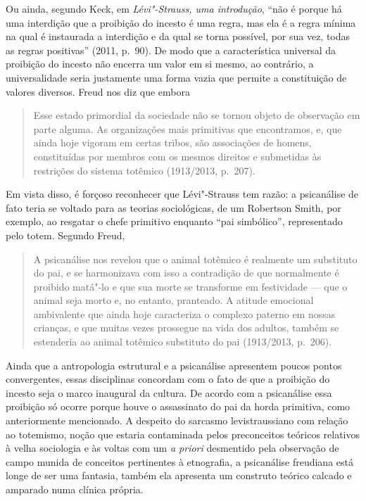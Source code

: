 Ou ainda, segundo Keck, em \emph{Lévi"-Strauss, uma introdução},
``não é porque há uma interdição que a proibição do incesto é uma regra,
mas ela é a regra mínima na qual é instaurada a interdição e da qual se
torna possível, por sua vez, todas as regras positivas'' (2011,
p.~90). De modo que a característica universal da proibição do incesto
não encerra um valor em si mesmo, ao contrário, a universalidade seria
justamente uma forma vazia que permite a constituição de valores
diversos. Freud nos diz que embora

\begin{quote}
Esse estado primordial da sociedade não se tornou objeto de observação
em parte alguma. As organizações mais primitivas que encontramos, e, que
ainda hoje vigoram em certas tribos, são associações de homens,
constituídas por membros com os mesmos direitos e submetidas às
restrições do sistema totêmico (1913/2013, p.~207).
\end{quote}

Em vista disso, é forçoso reconhecer que Lévi"-Strauss tem razão: a
psicanálise de fato teria se voltado para as teorias sociológicas, de um
Robertson Smith, por exemplo, ao resgatar o chefe primitivo enquanto
``pai simbólico'', representado pelo totem. Segundo Freud,

\begin{quote}
A psicanálise nos revelou que o animal totêmico é realmente um
substituto do pai, e se harmonizava com isso a contradição de que
normalmente é proibido matá"-lo e que sua morte se transforme em
festividade --- que o animal seja morto e, no entanto, pranteado. A
atitude emocional ambivalente que ainda hoje caracteriza o complexo
paterno em nossas crianças, e que muitas vezes prossegue na vida dos
adultos, também se estenderia ao animal totêmico substituto do pai
(1913/2013, p.~206).
\end{quote}

Ainda que a antropologia estrutural e a psicanálise apresentem poucos
pontos convergentes, essas disciplinas concordam com o fato de que a
proibição do incesto seja o marco inaugural da cultura. De acordo com a
psicanálise essa proibição só ocorre porque houve o assassinato do pai
da horda primitiva, como anteriormente mencionado. A despeito do
sarcasmo levistraussiano com relação ao totemismo, noção que estaria
contaminada pelos preconceitos teóricos relativos à velha sociologia e
às voltas com um \emph{a priori} desmentido pela observação de campo
munida de conceitos pertinentes à etnografia, a psicanálise freudiana
está longe de ser uma fantasia, também ela apresenta um construto
teórico calcado e amparado numa clínica própria.

